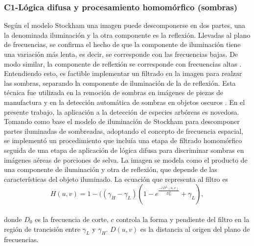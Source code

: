 \subsubsection{C1-Lógica difusa y procesamiento homomórfico (sombras)}
Según el modelo Stockham \cite{stockham_image_1972} una imagen puede descomponerse en dos partes, una la denominada iluminación y la otra componente es la reflexión. Llevadas al plano de frecuencias, se confirma el hecho de que la componente de iluminación tiene una variación más lenta, es decir, se corresponde con las frecuencias bajas. De modo similar, la componente de reflexión se corresponde con frecuencias altas \cite{oppenheim_nonlinear_1968}. Entendiendo esto, es factible implementar un filtrado en la imagen para realzar las sombras, separando la componente de iluminación de la de reflexión. Esta técnica fue utilizada en la remoción de sombras en imágenes de piezas de manufactura \cite{yang_research_2012} y en la detección automática de sombras en objetos oscuros \cite{etemadnia_automatic_2003}. En el presente trabajo, la aplicación a la detección de especies arbóreas es novedosa. 
Tomando como base el modelo de iluminación de Stockham para descomponer partes iluminadas de sombreadas, adoptando el concepto de frecuencia espacial, se implementó un procedimiento que incluía una etapa de filtrado homomórfico seguida de una etapa de aplicación de lógica difusa para discriminar sombras en imágenes aéreas de porciones de selva.
La imagen se modela como el producto de una componente de iluminación y otra de reflexión, que depende de las características del objeto iluminado. 
La ecuación que representa al filtro es
\\
\begin{equation}
	H(u,v)=1-((\gamma_H-\gamma_L)(1-e^{\frac{-cD^L(u,v)}{D^L_0}}+\gamma_L),\label{filtro homomorfico}
\end{equation}
\\


donde $D_0$ es la frecuencia de corte, $c$ controla la forma y pendiente del filtro en la región de trancisión entre $\gamma_L$ y $\gamma_H$. $D(u,v)$ es la distancia al origen del plano de frecuencias.

